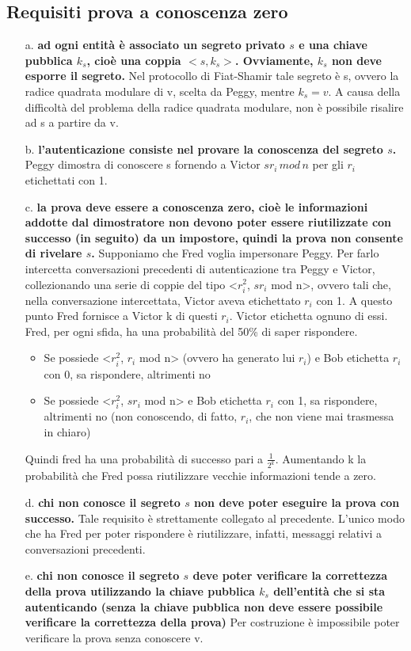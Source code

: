 \subsection{Requisiti prova a conoscenza zero}
\begin{itemize}
\item[a.] \textbf{ad ogni entità è associato un segreto privato $s$ e una chiave pubblica $k_{s}$, cioè una coppia $<s, k_{s}>$. Ovviamente, $k_{s}$ non deve esporre il segreto.} Nel protocollo di Fiat-Shamir tale segreto è s, ovvero la radice quadrata modulare di v, scelta da Peggy, mentre $k_s = v$. A causa della difficoltà del problema della radice quadrata modulare, non è possibile risalire ad s a partire da v.
\item[b.] \textbf{l'autenticazione consiste nel provare la conoscenza del segreto $s$.} Peggy dimostra di conoscere s fornendo a Victor $sr_{i} \, mod \, n$ per gli $r_{i}$ etichettati con 1.
\item[c.] \textbf{la prova deve essere a conoscenza zero, cioè le informazioni addotte dal dimostratore non devono poter essere riutilizzate con successo (in seguito) da un impostore, quindi la prova non consente di rivelare $s$.} Supponiamo che Fred voglia impersonare Peggy. Per farlo intercetta conversazioni precedenti di autenticazione tra Peggy e Victor, collezionando una serie di coppie del tipo <$r_{i}^2$, $sr_{i}$ mod n>, ovvero tali che, nella conversazione intercettata, Victor aveva etichettato $r_i$ con 1. A questo punto Fred fornisce a Victor k di questi $r_{i}$. Victor etichetta ognuno di essi. Fred, per ogni sfida, ha una probabilità del 50\% di saper rispondere. 
	\begin{itemize}
	\item Se possiede <$r_{i}^2$, $r_{i}$ mod n> (ovvero ha generato lui $r_i$) e Bob etichetta $r_i$ con 0, sa rispondere, altrimenti no
	\item Se possiede <$r_{i}^2$, $sr_{i}$ mod n> e Bob etichetta $r_i$ con 1, sa rispondere, altrimenti no (non conoscendo, di fatto, $r_i$, che non viene mai trasmessa in chiaro)
	\end{itemize} 
Quindi fred ha una probabilità di successo pari a $\frac{1}{2^k}$. Aumentando k la probabilità che Fred possa riutilizzare vecchie informazioni tende a zero.
\item[d.] \textbf{chi non conosce il segreto $s$ non deve poter eseguire la prova con successo.} Tale requisito è strettamente collegato al precedente. L'unico modo che ha Fred per poter rispondere è riutilizzare, infatti, messaggi relativi a conversazioni precedenti.
\item[e.] \textbf{chi non conosce il segreto $s$ deve poter verificare la correttezza della prova utilizzando la chiave pubblica $k_{s}$ dell'entità che si sta autenticando (senza la chiave pubblica non deve essere possibile verificare la correttezza della prova)} Per costruzione è impossibile poter verificare la prova senza conoscere v.
\end{itemize}
 


